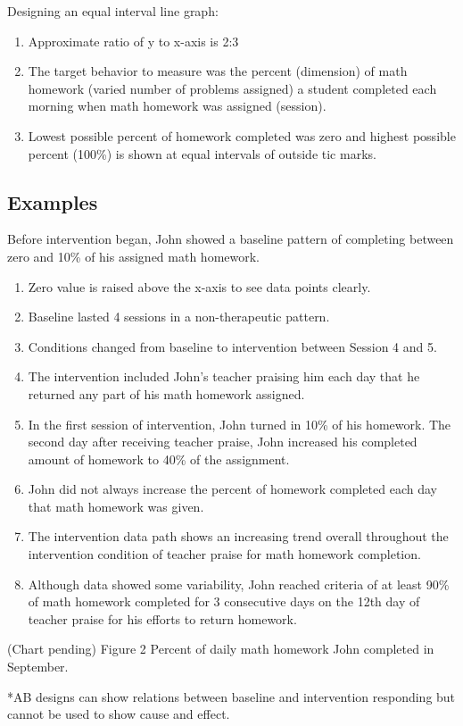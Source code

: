 Designing an equal interval line graph:
\begin{enumerate}
\item Approximate ratio of y to x-axis is 2:3
\item The target behavior to measure was the percent (dimension) of math homework (varied number of problems assigned) a student completed each morning when math homework was assigned (session).
\item Lowest possible percent of homework completed was zero and highest possible percent (100\%) is shown at equal intervals of outside tic marks.
\end{enumerate}

\subsection{Examples}
Before intervention began, John showed a baseline pattern of completing between zero and 10\% of his assigned math homework.
\begin{enumerate}
\item Zero value is raised above the x-axis to see data points clearly.
\item Baseline lasted 4 sessions in a non-therapeutic pattern.
\item Conditions changed from baseline to intervention between Session 4 and 5.
\item The intervention included John's teacher praising him each day that he returned any part of his math homework assigned. 
\item In the first session of intervention, John turned in 10\% of his homework. The second day after receiving teacher praise, John increased his completed amount of homework to 40\% of the assignment. 
\item John did not always increase the percent of homework completed each day that math homework was given.
\item The intervention data path shows an increasing trend overall throughout the intervention condition of teacher praise for math homework completion. 
\item Although data showed some variability, John reached criteria of at least 90\% of math homework completed for 3 consecutive days on the 12th day of teacher praise for his efforts to return homework.
\end{enumerate}
%
(Chart pending) Figure 2    Percent of daily math homework John completed in September.

*AB designs can show relations between baseline and intervention responding but cannot be used to show cause and effect.
%
